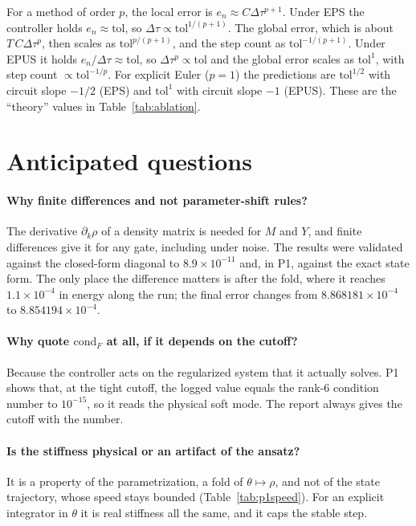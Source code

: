 \documentclass[aps,pra,reprint,superscriptaddress,nofootinbib]{revtex4-2}
\newcommand{\dt}{\Delta\tau}
\newcommand{\cond}{\mathrm{cond}}
\newcommand{\tol}{\mathrm{tol}}
\begin{document}
For a method of order $p$, the local error is $e_n\approx C\dt^{p+1}$. Under EPS the controller
holds $e_n\approx\tol$, so $\dt\propto\tol^{1/(p+1)}$. The global error, which is about
$T\,C\dt^{p}$, then scales as $\tol^{p/(p+1)}$, and the step count as $\tol^{-1/(p+1)}$. Under
EPUS it holds $e_n/\dt\approx\tol$, so $\dt^p\propto\tol$ and the global error scales as
$\tol^1$, with step count $\propto\tol^{-1/p}$. For explicit Euler ($p=1$) the predictions are
$\tol^{1/2}$ with circuit slope $-1/2$ (EPS) and $\tol^{1}$ with circuit slope $-1$ (EPUS). These
are the ``theory'' values in Table~\ref{tab:ablation}.

\section{Anticipated questions}
\label{app:qa}

\paragraph*{Why finite differences and not parameter-shift rules?} The derivative $\partial_k\rho$
of a density matrix is needed for $M$ and $Y$, and finite differences give it for any gate,
including under noise. The results were validated against the closed-form diagonal to
$8.9\times10^{-11}$ and, in P1, against the exact state form. The only place the difference
matters is after the fold, where it reaches $1.1\times10^{-4}$ in energy along the run; the
final error changes from $8.868181\times10^{-4}$ to $8.854194\times10^{-4}$.

\paragraph*{Why quote $\cond_F$ at all, if it depends on the cutoff?} Because the controller acts
on the regularized system that it actually solves. P1 shows that, at the tight cutoff, the
logged value equals the rank-6 condition number to $10^{-15}$, so it reads the physical soft
mode. The report always gives the cutoff with the number.

\paragraph*{Is the stiffness physical or an artifact of the ansatz?} It is a property of the
parametrization, a fold of $\theta\mapsto\rho$, and not of the state trajectory, whose speed
stays bounded (Table~\ref{tab:p1speed}). For an explicit integrator in $\theta$ it is real
stiffness all the same, and it caps the stable step.
\end{document}
